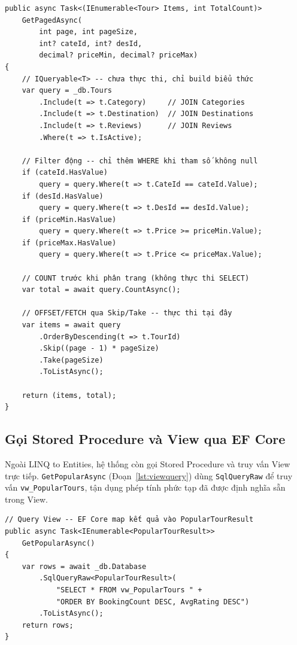 \begin{lstlisting}[style=csharp,
  caption={LINQ to Entities trong TourRepository.GetPagedAsync},
  label={lst:linq}]
public async Task<(IEnumerable<Tour> Items, int TotalCount)>
    GetPagedAsync(
        int page, int pageSize,
        int? cateId, int? desId,
        decimal? priceMin, decimal? priceMax)
{
    // IQueryable<T> -- chưa thực thi, chỉ build biểu thức
    var query = _db.Tours
        .Include(t => t.Category)     // JOIN Categories
        .Include(t => t.Destination)  // JOIN Destinations
        .Include(t => t.Reviews)      // JOIN Reviews
        .Where(t => t.IsActive);

    // Filter động -- chỉ thêm WHERE khi tham số không null
    if (cateId.HasValue)
        query = query.Where(t => t.CateId == cateId.Value);
    if (desId.HasValue)
        query = query.Where(t => t.DesId == desId.Value);
    if (priceMin.HasValue)
        query = query.Where(t => t.Price >= priceMin.Value);
    if (priceMax.HasValue)
        query = query.Where(t => t.Price <= priceMax.Value);

    // COUNT trước khi phân trang (không thực thi SELECT)
    var total = await query.CountAsync();

    // OFFSET/FETCH qua Skip/Take -- thực thi tại đây
    var items = await query
        .OrderByDescending(t => t.TourId)
        .Skip((page - 1) * pageSize)
        .Take(pageSize)
        .ToListAsync();

    return (items, total);
}
\end{lstlisting}

\subsection{Gọi Stored Procedure và View qua EF Core}
  \label{sub3.4.3}

Ngoài LINQ to Entities, hệ thống còn gọi Stored Procedure
và truy vấn View trực tiếp. \texttt{GetPopularAsync}
(Đoạn~\ref{lst:viewquery}) dùng \texttt{SqlQueryRaw} để
truy vấn \texttt{vw\_PopularTours}, tận dụng phép tính phức
tạp đã được định nghĩa sẵn trong View.

\begin{lstlisting}[style=csharp,
  caption={Query vw\_PopularTours qua EF SqlQueryRaw},
  label={lst:viewquery}]
// Query View -- EF Core map kết quả vào PopularTourResult
public async Task<IEnumerable<PopularTourResult>>
    GetPopularAsync()
{
    var rows = await _db.Database
        .SqlQueryRaw<PopularTourResult>(
            "SELECT * FROM vw_PopularTours " +
            "ORDER BY BookingCount DESC, AvgRating DESC")
        .ToListAsync();
    return rows;
}
\end{lstlisting}


